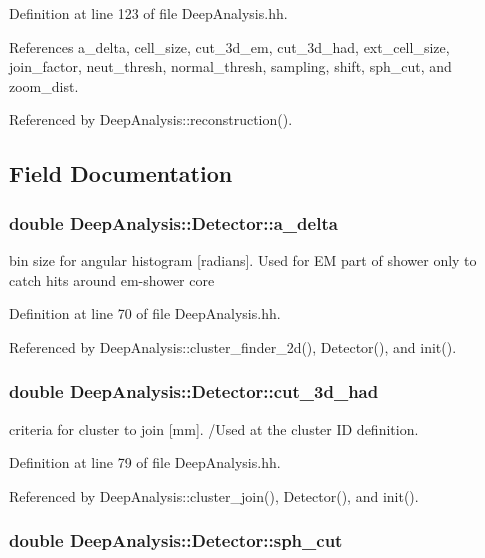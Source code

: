 Definition at line 123 of file DeepAnalysis.hh.

References a\_\-delta, cell\_\-size, cut\_\-3d\_\-em, cut\_\-3d\_\-had, ext\_\-cell\_\-size, join\_\-factor, neut\_\-thresh, normal\_\-thresh, sampling, shift, sph\_\-cut, and zoom\_\-dist.

Referenced by DeepAnalysis::reconstruction().

\subsection{Field Documentation}
\subsubsection[{a\_\-delta}]{\setlength{\rightskip}{0pt plus 5cm}double {\bf DeepAnalysis::Detector::a\_\-delta}}\label{classDeepAnalysis_1_1Detector_a73833e2ee36a7ade0f7960a9344692be}


bin size for angular histogram [radians]. Used for EM part of shower only to catch hits around em-\/shower core 

Definition at line 70 of file DeepAnalysis.hh.

Referenced by DeepAnalysis::cluster\_\-finder\_\-2d(), Detector(), and init().
\subsubsection[{cut\_\-3d\_\-had}]{\setlength{\rightskip}{0pt plus 5cm}double {\bf DeepAnalysis::Detector::cut\_\-3d\_\-had}}\label{classDeepAnalysis_1_1Detector_a5cbc531fe713289bc6682f4086129b5c}


criteria for cluster to join [mm]. /Used at the cluster ID definition. 

Definition at line 79 of file DeepAnalysis.hh.

Referenced by DeepAnalysis::cluster\_\-join(), Detector(), and init().
\subsubsection[{sph\_\-cut}]{\setlength{\rightskip}{0pt plus 5cm}double {\bf DeepAnalysis::Detector::sph\_\-cut}}\label{classDeepAnalysis_1_1Detector_a0c215c59b599b6a585056c880278b860}


